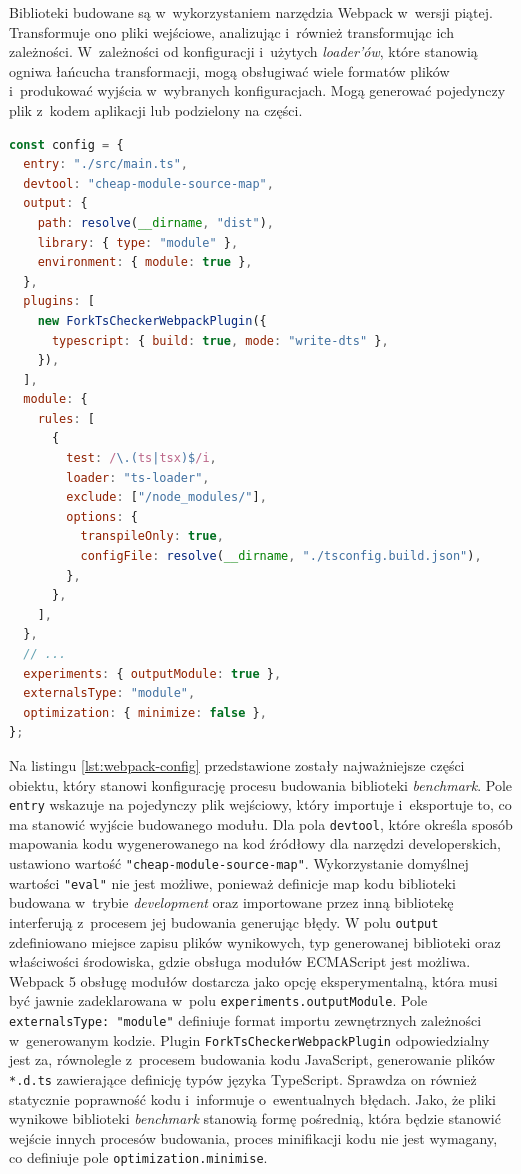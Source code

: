 Biblioteki budowane są w~wykorzystaniem narzędzia Webpack w~wersji piątej. Transformuje ono pliki wejściowe, analizując i~również transformując ich zależności. W~zależności od konfiguracji i~użytych \textit{loader'ów}, które stanowią ogniwa łańcucha transformacji, mogą obsługiwać wiele formatów plików i~produkować wyjścia w~wybranych konfiguracjach. Mogą generować pojedynczy plik z~kodem aplikacji lub podzielony na części.

\begin{lstlisting}[language=JavaScript, caption=Konfiguracja narzędzia Webpack służąca do budowania biblioteki \textit{benchmark},label=lst:webpack-config]
const config = {
  entry: "./src/main.ts",
  devtool: "cheap-module-source-map",
  output: {
    path: resolve(__dirname, "dist"),
    library: { type: "module" },
    environment: { module: true },
  },
  plugins: [
    new ForkTsCheckerWebpackPlugin({
      typescript: { build: true, mode: "write-dts" },
    }),
  ],
  module: {
    rules: [
      {
        test: /\.(ts|tsx)$/i,
        loader: "ts-loader",
        exclude: ["/node_modules/"],
        options: {
          transpileOnly: true,
          configFile: resolve(__dirname, "./tsconfig.build.json"),
        },
      },
    ],
  },
  // ...
  experiments: { outputModule: true },
  externalsType: "module",
  optimization: { minimize: false },
};
\end{lstlisting}

Na listingu \ref{lst:webpack-config} przedstawione zostały najważniejsze części obiektu, który stanowi konfigurację procesu budowania biblioteki \textit{benchmark}. Pole \lstinline{entry} wskazuje na pojedynczy plik wejściowy, który importuje i~eksportuje to, co ma stanowić wyjście budowanego modułu. Dla pola \lstinline{devtool}, które określa sposób mapowania kodu wygenerowanego na kod źródłowy dla narzędzi developerskich, ustawiono wartość \lstinline{"cheap-module-source-map"}. Wykorzystanie domyślnej wartości \lstinline{"eval"} nie jest możliwe, ponieważ definicje map kodu biblioteki budowana w~trybie \textit{development} oraz importowane przez inną bibliotekę interferują z~procesem jej budowania generując błędy.
W polu \lstinline{output} zdefiniowano miejsce zapisu plików wynikowych, typ generowanej biblioteki oraz właściwości środowiska, gdzie obsługa modułów ECMAScript jest możliwa. Webpack 5 obsługę modułów dostarcza jako opcję eksperymentalną, która musi być jawnie zadeklarowana w~polu \lstinline{experiments.outputModule}. Pole \lstinline{externalsType: "module"} definiuje format importu zewnętrznych zależności w~generowanym kodzie. Plugin \lstinline{ForkTsCheckerWebpackPlugin} odpowiedzialny jest za, równolegle z~procesem budowania kodu JavaScript, generowanie plików \lstinline{*.d.ts} zawierające definicję typów języka TypeScript. Sprawdza on również statycznie poprawność kodu i~informuje o~ewentualnych błędach. Jako, że pliki wynikowe biblioteki \textit{benchmark} stanowią formę pośrednią, która będzie stanowić wejście innych procesów budowania, proces minifikacji kodu nie jest wymagany, co definiuje pole \lstinline{optimization.minimise}.

